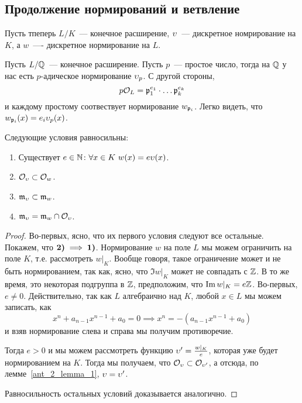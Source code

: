 	\subsection{Продолжение нормирований и ветвление}	


	Пусть тпеперь $L/K$~--- конечное расширение, $\v$~--- дискретное номрирование на $K$, а $w$~---- дискретное нормирование на $L$. 

	\begin{example}
		Пусть $L/\Q$~--- конечное расширение. Пусть $p$~--- простое число, тогда на $\Q$ у нас есть $p$-адическое нормирование $\v_{p}$. С другой стороны, 
		\[
			p\cO_{L} = \fp_{1}^{e_1} \cdot \ldots \fp_{k}^{e_k}
		\]
		и каждому простому соотвествует нормирование $w_{\fp_i}$. Легко видеть, что $w_{\fp_i}(x) = e_i \v_{p}(x)$. 
	\end{example}

	\begin{statement} 
		Следующие условия равносильны: 

		\begin{enumerate}
			\item Существует $e \in \N\colon \forall x \in K \ w(x) = e\v(x)$.

			\item $\cO_{\v} \subset \cO_{w}$.

			\item $\fm_{\v} \subset \fm_{w}$.

			\item $\fm_{\v} = \fm_{w} \cap \cO_{\v}$.
		\end{enumerate}
	\end{statement}
	\begin{proof}
		Во-первых, ясно, что их первого условия следуют все остальные. Покажем, что $\bf{2)} \implies \bf{1)}$. Нормирование $w$ на поле $L$ мы можем ограничить на поле $K$, т.е. рассмотреть $w\vert_{K}$. Вообще говоря, такое ограничение может и не быть нормированием, так как, ясно, что $\Im{w\vert_{K}}$ может не совпадать с $\Z$. В то же время, это некоторая подгруппа в $\Z$, предположим, что $\Im{w\vert_{K}} = e\Z$. Во-первых, $e \neq 0$. Действительно, так как $L$ алгебраично над $K$, любой $x \in L$ мы можем записать, как 
		\[
			x^n + a_{n - 1}x^{n - 1} + a_0 = 0 \implies x^n = -(a_{n - 1}x^{n - 1} + a_0)
		\]
		и взяв нормирование слева и справа мы получим противоречие. 

		Тогда $e > 0$ и мы можем рассмотреть функцию $\v' = \frac{w\vert_{K}}{e}$, которая уже будет нормированием на $K$. Тогда мы получаем, что $\cO_{\v} \subset \cO_{\v'}$, а отсюда, по лемме~\ref{ant_2_lemma_1}, $\v = \v'$.  

		Равносильность остальных условий доказывается аналогично. 
	\end{proof}

